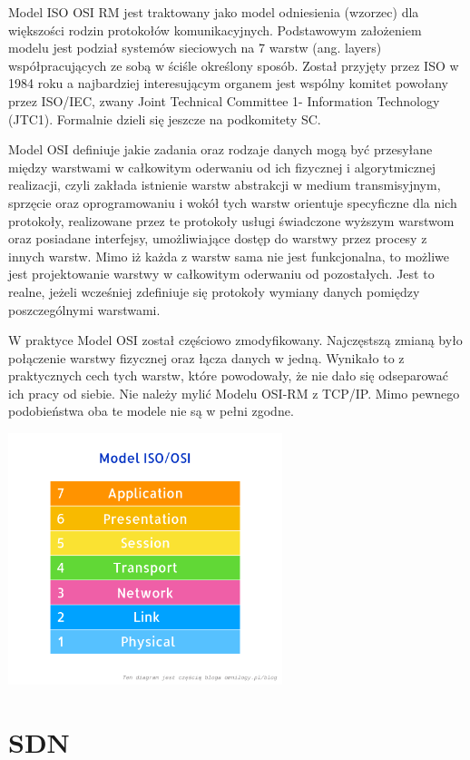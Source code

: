 \documentclass{article}
\begin{document}
Model ISO OSI RM jest traktowany jako model odniesienia (wzorzec) dla większości rodzin protokołów komunikacyjnych. Podstawowym założeniem modelu jest podział systemów sieciowych na 7 warstw (ang. layers) współpracujących ze sobą w ściśle określony sposób. Został przyjęty przez ISO w 1984 roku a najbardziej interesującym organem jest wspólny komitet powołany przez ISO/IEC, zwany Joint Technical Committee 1- Information Technology (JTC1). Formalnie dzieli się jeszcze na podkomitety SC.
 
 Model OSI definiuje jakie zadania oraz rodzaje danych mogą być przesyłane między warstwami w całkowitym oderwaniu od ich fizycznej i algorytmicznej realizacji, czyli zakłada istnienie warstw abstrakcji w medium transmisyjnym, sprzęcie oraz oprogramowaniu i wokół tych warstw orientuje specyficzne dla nich protokoły, realizowane przez te protokoły usługi świadczone wyższym warstwom oraz posiadane interfejsy, umożliwiające dostęp do warstwy przez procesy z innych warstw. Mimo iż każda z warstw sama nie jest funkcjonalna, to możliwe jest projektowanie warstwy w całkowitym oderwaniu od pozostałych. Jest to realne, jeżeli wcześniej zdefiniuje się protokoły wymiany danych pomiędzy poszczególnymi warstwami.
 
 W praktyce Model OSI został częściowo zmodyfikowany. Najczęstszą zmianą było połączenie warstwy fizycznej oraz łącza danych w jedną. Wynikało to z praktycznych cech tych warstw, które powodowały, że nie dało się odseparować ich pracy od siebie. Nie należy mylić Modelu OSI-RM z TCP/IP. Mimo pewnego podobieństwa oba te modele nie są w pełni zgodne.
 


\includegraphics[width=0.6\textwidth]{OSI.png}

\newpage

\section{SDN}
\end{document}
